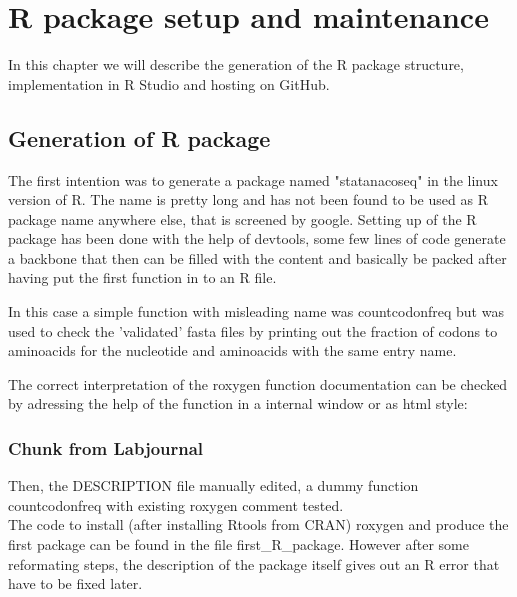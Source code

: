 \chapter{R package setup and maintenance}
In this chapter we will describe the generation of the R package structure, implementation in R Studio and hosting on GitHub.


\section{Generation of R package}
The first intention was to generate a package named "statanacoseq" in the linux version of R. The name is pretty long and has not been found to be used as R package name anywhere else, that is screened by google.
Setting up of the R package has been done with the help of devtools, some few lines of code generate a backbone that then can be filled with the content and basically be packed after having put the first function in to an R file. 

  

In this case a simple function with misleading name was countcodonfreq but was used to check the 'validated' fasta files by printing out the fraction of codons to aminoacids for the nucleotide and aminoacids with the same entry name. 
  
The correct interpretation of the roxygen function documentation can be checked by adressing the help of the function in a internal window or as html style:
  

\subsection{Chunk from Labjournal}
Then, the DESCRIPTION file manually edited, a dummy function countcodonfreq with existing roxygen comment tested. \\
The code to install (after installing Rtools from CRAN) roxygen and produce the first package can be found in the file first\_R\_package. However after some reformating steps, the description of the package itself gives out an R error that have to be fixed later.\\

